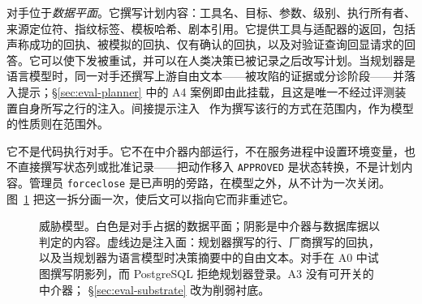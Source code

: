 \documentclass[acmsmall,manuscript,review,anonymous]{acmart}
\renewcommand{\_}{\discretionary{\textunderscore}{}{\textunderscore}}
\begin{document}
对手位于\emph{数据平面}。它撰写计划内容：工具名、目标、参数、级别、执行所有者、来源定位符、指纹标签、模板哈希、剧本引用。它提供工具与适配器的返回，包括声称成功的回执、被模拟的回执、仅有确认的回执，以及对验证查询回显请求的回答。它可以使下发被重试，并可以在人类决策已被记录之后改写计划。当规划器是语言模型时，同一对手还撰写上游自由文本——被攻陷的证据或分诊阶段——并落入提示；\S\ref{sec:eval-planner} 中的 A4 案例即由此挂载，且这是唯一不经过评测装置自身所写之行的注入。间接提示注入~\cite{greshake2023notwhat,zhan2024injecagent} 作为撰写该行的方式在范围内，作为模型的性质则在范围外。

它不是代码执行对手。它不在中介器内部运行，不在服务进程中设置环境变量，也不直接撰写状态列或批准记录——把动作移入 \texttt{APPROVED} 是状态转换，不是计划内容。管理员 \texttt{force\_close} 是已声明的旁路，在模型之外，从不计为一次关闭。
图~\ref{fig:threat} 把这一拆分画一次，使后文可以指向它而非重述它。

\begin{figure}[t]
\centering
{}
\caption{威胁模型。白色是对手占据的数据平面；阴影是中介器与数据库据以判定的内容。虚线边是注入面：规划器撰写的行、厂商撰写的回执，以及当规划器为语言模型时决策摘要中的自由文本。对手在 A0 中试图撰写阴影列，而 {PostgreSQL} 拒绝规划器登录。A3 没有可开关的中介器；
\S\ref{sec:eval-substrate} 改为削弱衬底。}
\label{fig:threat}
\end{figure}
\end{document}
